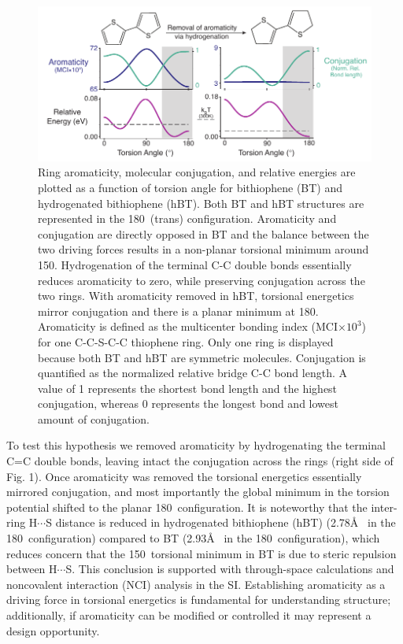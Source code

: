 \begin{figure}[hbt!]
    \centering
    \includegraphics{figures/chap3/fig1_d2.pdf}
    \caption{Ring aromaticity, molecular conjugation, and relative energies are plotted as a function of torsion angle for bithiophene (BT) and hydrogenated bithiophene (hBT). Both BT and hBT structures are represented in the 180\textdegree \ (trans) configuration. Aromaticity and conjugation are directly opposed in BT and the balance between the two driving forces results in a non-planar torsional minimum around 150\textdegree. Hydrogenation of the terminal C-C double bonds essentially reduces aromaticity to zero, while preserving conjugation across the two rings. With aromaticity removed in hBT, torsional energetics mirror conjugation and there is a planar minimum at 180\textdegree. Aromaticity is defined as the multicenter bonding index (MCI$\times 10^3$) for one C-C-S-C-C thiophene ring. Only one ring is displayed because both BT and hBT are symmetric molecules. Conjugation is quantified as the normalized relative bridge C-C bond length. A value of 1 represents the shortest bond length and the highest conjugation, whereas 0 represents the longest bond and lowest amount of conjugation.}
    \label{fig:a_vs_c}
\end{figure}

To test this hypothesis we removed aromaticity by hydrogenating the terminal C=C double bonds, leaving intact the conjugation across the rings (right side of Fig. 1). Once aromaticity was removed the torsional energetics essentially mirrored conjugation, and most importantly the global minimum in the torsion potential shifted to the planar 180\textdegree \ configuration. It is noteworthy that the inter-ring H$\cdots$S distance is reduced in hydrogenated bithiophene (hBT) (2.78\si{\angstrom} \ in the 180\textdegree \ configuration) compared to BT (2.93\si{\angstrom} \ in the 180\textdegree \ configuration), which reduces concern that the 150\textdegree \ torsional minimum in BT is due to steric repulsion between H$\cdots$S. This conclusion is supported with through-space calculations and noncovalent interaction (NCI) analysis\cite{Johnson2010, Contreras-Garcia2011} in the SI. Establishing aromaticity as a driving force in torsional energetics is fundamental for understanding structure; additionally, if aromaticity can be modified or controlled it may represent a design opportunity.

